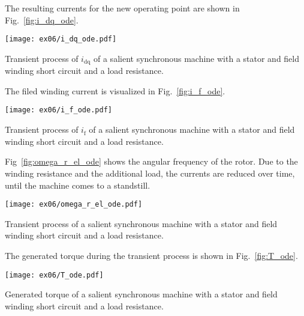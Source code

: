 \FloatBarrier


\begin{solutionblock}
    The resulting currents for the new operating point are shown in Fig.~\ref{fig:i_dq_ode}.
    \begin{solutionfigure}
        \centering
        \texttt{[image: ex06/i\_dq\_ode.pdf]}
        \caption{Transient process of $i_{\mathrm{dq}}$ of a salient synchronous machine with a stator and field winding short circuit and a load resistance.}
        \label{fig:i_dq_ode}
    \end{solutionfigure}

    The filed winding current is visualized in Fig.~\ref{fig:i_f_ode}.
    \begin{solutionfigure}
        \centering
        \texttt{[image: ex06/i\_f\_ode.pdf]}
        \caption{Transient process of $i_{\mathrm{f}}$ of a salient synchronous machine with a stator and field winding short circuit and a load resistance.}
        \label{fig:i_f_ode}
    \end{solutionfigure}

    Fig~\ref{fig:omega_r_el_ode} shows the angular frequency of the rotor. Due to the winding resistance and the additional load, the currents are reduced over time, until the machine comes to a standstill.
    \begin{solutionfigure}
        \centering
        \texttt{[image: ex06/omega\_r\_el\_ode.pdf]}
        \caption{Transient process of a salient synchronous machine with a stator and field winding short circuit and a load resistance.}
        \label{fig:omega_r_el_ode}
    \end{solutionfigure}

    The generated torque during the transient process is shown in Fig.~\ref{fig:T_ode}.
    \begin{solutionfigure}
        \centering
        \texttt{[image: ex06/T\_ode.pdf]}
        \caption{Generated torque of a salient synchronous machine with a stator and field winding short circuit and a load resistance.}
        \label{fig:T_ode}
    \end{solutionfigure}


\end{solutionblock}

